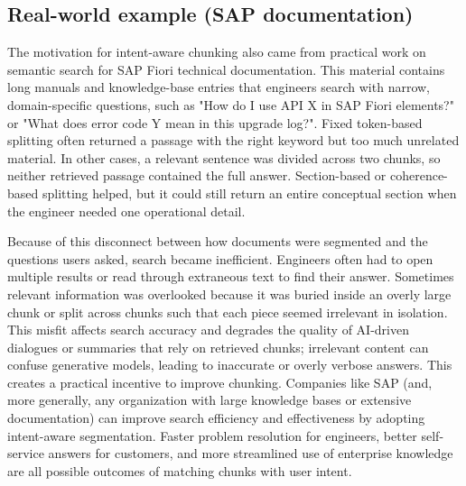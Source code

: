 \documentclass[12pt,a4paper]{report}
\begin{document}
\subsection{Real-world example (SAP documentation)}
The motivation for intent-aware chunking also came from practical work on semantic search for SAP Fiori technical documentation. This material contains long manuals and knowledge-base entries that engineers search with narrow, domain-specific questions, such as "How do I use API X in SAP Fiori elements?" or "What does error code Y mean in this upgrade log?". Fixed token-based splitting often returned a passage with the right keyword but too much unrelated material. In other cases, a relevant sentence was divided across two chunks, so neither retrieved passage contained the full answer. Section-based or coherence-based splitting helped, but it could still return an entire conceptual section when the engineer needed one operational detail.

Because of this disconnect between how documents were segmented and the questions users asked, search became inefficient. Engineers often had to open multiple results or read through extraneous text to find their answer. Sometimes relevant information was overlooked because it was buried inside an overly large chunk or split across chunks such that each piece seemed irrelevant in isolation. This misfit affects search accuracy and degrades the quality of AI-driven dialogues or summaries that rely on retrieved chunks; irrelevant content can confuse generative models, leading to inaccurate or overly verbose answers. This creates a practical incentive to improve chunking. Companies like SAP (and, more generally, any organization with large knowledge bases or extensive documentation) can improve search efficiency and effectiveness by adopting intent-aware segmentation. Faster problem resolution for engineers, better self-service answers for customers, and more streamlined use of enterprise knowledge are all possible outcomes of matching chunks with user intent.
\end{document}
